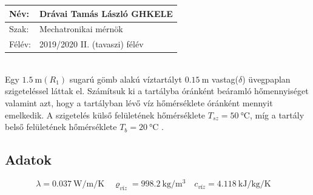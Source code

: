 \documentclass[12pt, a4paper, onecolumn]{article}
\begin{document}
\begin{tabular}{ | p{2cm} | p{14cm} | } 
	\hline
	Név: & Drávai Tamás László GHKELE\\ 
	\hline
	Szak: & Mechatronikai mérnök \\ 
	\hline
	Félév: & 2019/2020 II. (tavaszi) félév \\ 
	\hline
\end{tabular}
\vspace{4mm}
\\Egy $\SI{1,5}{\meter} (R_1)$ sugarú gömb alakú víztartályt $\SI{0,15}{\meter}$ vastag($\delta$) üvegpaplan szigeteléssel láttak el. Számítsuk ki a tartályba óránként beáramló hőmennyiséget valamint azt, hogy a tartályban lévő víz hőmérséklete óránként mennyit emelkedik. A szigetelés külső felületének hőmérséklete $T_{sz}=\SI{50}{\celsius}$, míg a tartály belső felületének hőmérséklete $T_{b}=\SI{20}{\celsius}$ .
\subsection*{Adatok}
\begin{equation*}
\lambda=\SI[per-mode=fraction]{0,037}{\watt\per\meter\per\kelvin} \quad 
\varrho_{víz} =\SI[per-mode=fraction]{998,2}{\kilogram\per\cubic\meter}\quad 
c_{\textit{víz}}=\SI[per-mode=fraction]{4,118}{\kJ \per \kilogram\per\kelvin}\quad
\end{equation*}
\end{document}
